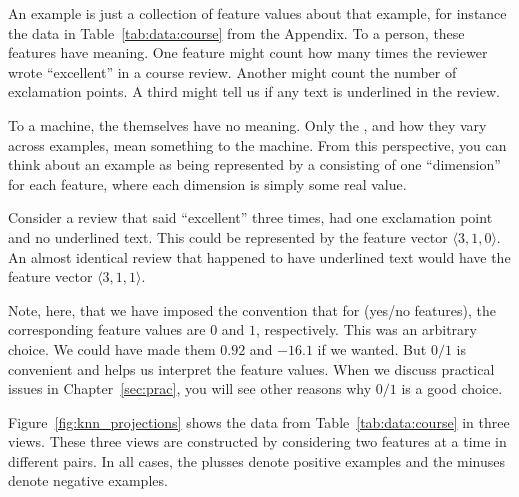 An example is just a collection of feature values about that example,
for instance the data in Table~\ref{tab:data:course} from the Appendix.
To a person, these features have meaning.  One feature might count how
many times the reviewer wrote ``excellent'' in a course review.
Another might count the number of exclamation points.  A third might
tell us if any text is underlined in the review.

To a machine, the  themselves have no meaning.  Only
the , and how they vary across examples, mean
something to the machine.  From this perspective, you can think about
an example as being represented by a 
consisting of one ``dimension'' for each feature, where each dimension
is simply some real value.

Consider a review that said ``excellent'' three times, had one
exclamation point and no underlined text.  This could be represented
by the feature vector $\langle 3, 1, 0 \rangle$.  An almost identical
review that happened to have underlined text would have the feature
vector $\langle 3,1,1\rangle$.

Note, here, that we have imposed the convention that for
 (yes/no features), the corresponding feature
values are $0$ and $1$, respectively.  This was an arbitrary choice.
We could have made them $0.92$ and $-16.1$ if we wanted.  But $0/1$ is
convenient and helps us interpret the feature values.  When we discuss
practical issues in Chapter~\ref{sec:prac}, you will see other reasons
why $0/1$ is a good choice.


Figure~\ref{fig:knn_projections} shows the data from
Table~\ref{tab:data:course} in three views.  These three views are
constructed by considering two features at a time in different pairs.
In all cases, the plusses denote positive examples and the minuses
denote negative examples.


